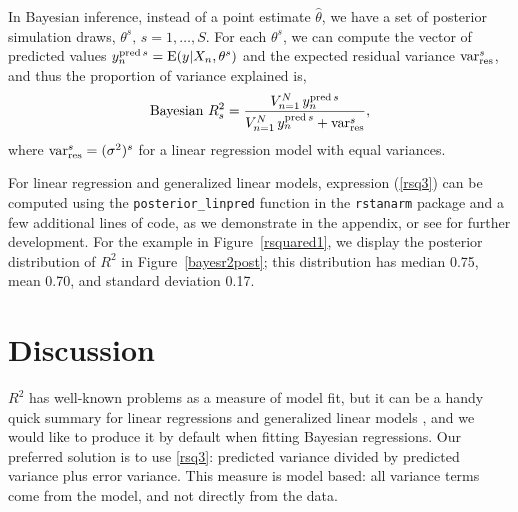 \documentclass[11pt]{article}
\begin{document}
In Bayesian inference, instead of a point estimate $\hat{\theta}$, we have
a set of posterior simulation draws, $\theta^s, \,s=1,\ldots,S$.
For each $\theta^s$, we can compute the vector of predicted values
$y^{{\rm pred}\,s}_n = \mbox{E}(y | X_n, \theta^s)$ and the expected residual variance
$\mbox{var}_{\rm res}^s$, and thus the proportion of variance explained is,
%
\begin{equation}\label{rsq3}
\mbox{Bayesian } R^2_s = 
	\frac{V_{n=1}^N \,y^{{\rm pred}\,s}_n} {V_{n=1}^N \,y^{{\rm pred}\,s}_n  +\mbox{var}_{\rm res}^s},
      \end{equation}
      where $\mbox{var}_{\rm res}^s=(\sigma^2)^s$ for a linear regression model with equal variances.
%



For linear regression and generalized linear models, expression (\ref{rsq3}) can be computed using the \verb#posterior_linpred# function in the {\tt rstanarm}
package and a few additional lines of code, as we demonstrate in the appendix, or see \cite{br2} for further development.
For the example in Figure~\ref{rsquared1}, we display the posterior distribution of $R^2$ in Figure~\ref{bayesr2post}; this distribution has median 0.75, mean 0.70, and standard deviation 0.17.

\section{Discussion}
$R^2$ has well-known problems as a measure of model fit, but it can be a handy quick summary for linear regressions and generalized linear models \citep[see, for example,][]{HuPaltaShao2006}, and we would like to produce it by default when fitting Bayesian regressions.  Our preferred solution is to use \eqref{rsq3}:  predicted variance divided by predicted variance plus error variance.   This measure is model based:  all variance terms come from the model, and not directly from the data.
\end{document}
